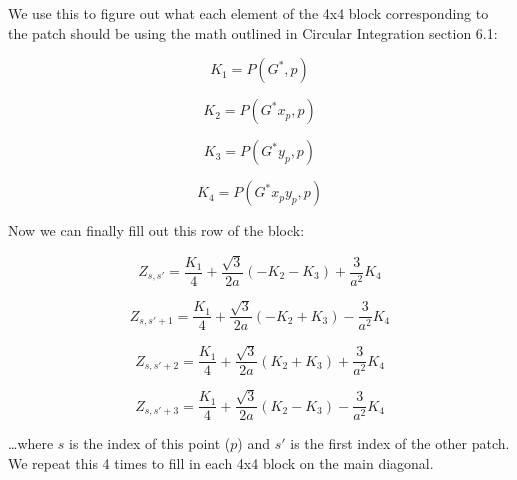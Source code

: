 \documentclass[etd,twoside,senior]{BYUPhys}
\begin{document}
We use this to figure out what each element of the 4x4 block corresponding
to the patch should be using the math outlined in Circular Integration
section 6.1:

\begin{equation}
  K_{1}=P\left(G^{*},p\right)
\end{equation}

\begin{equation}
  K_{2}=P\left(G^{*}x_{p},p\right)
\end{equation}

\begin{equation}
  K_{3}=P\left(G^{*}y_{p},p\right)
\end{equation}

\begin{equation}
  K_{4}=P\left(G^{*}x_{p}y_{p},p\right)
\end{equation}

Now we can finally fill out this row of the block:

\begin{equation}
  Z_{s,s'}=\frac{K_{1}}{4}+\frac{\sqrt{3}}{2a}\left(-K_{2}-K_{3}\right)+\frac{3}{a^{2}}K_{4}
\end{equation}

\begin{equation}
  Z_{s,s'+1}=\frac{K_{1}}{4}+\frac{\sqrt{3}}{2a}\left(-K_{2}+K_{3}\right)-\frac{3}{a^{2}}K_{4}
\end{equation}

\begin{equation}
  Z_{s,s'+2}=\frac{K_{1}}{4}+\frac{\sqrt{3}}{2a}\left(K_{2}+K_{3}\right)+\frac{3}{a^{2}}K_{4}
\end{equation}

\begin{equation}
  Z_{s,s'+3}=\frac{K_{1}}{4}+\frac{\sqrt{3}}{2a}\left(K_{2}-K_{3}\right)-\frac{3}{a^{2}}K_{4}
\end{equation}

\ldots where $s$ is the index of this point ($p$) and $s'$ is the first
index of the other patch. We repeat this 4 times to fill in each 4x4
block on the main diagonal.






\end{document}
